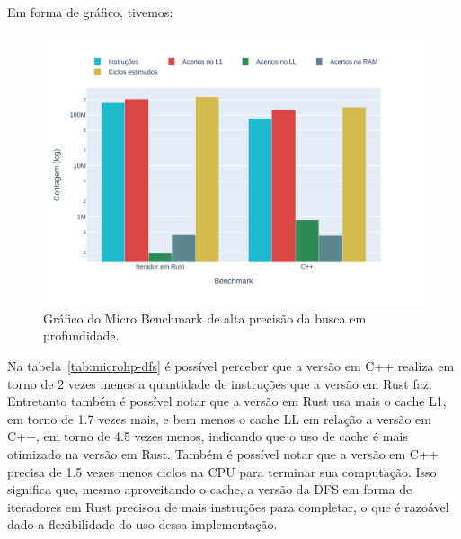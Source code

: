 Em forma de gráfico, tivemos:

\begin{figure}[!ht]
  \centering
  \caption{Gráfico do Micro Benchmark de alta precisão da busca em
  profundidade.}
  \includegraphics[width=\textwidth]{figures/benchmark-chart.pdf}
\end{figure}
\FloatBarrier

Na tabela~\ref{tab:microhp-dfs} é possível perceber que a versão em
C++ realiza em torno de 2 vezes menos a quantidade de instruções que
a versão em Rust faz. Entretanto também é possível notar que a versão
em Rust usa mais o cache L1, em torno de 1.7 vezes mais, e bem menos
o cache LL em relação a versão em C++, em torno de 4.5 vezes menos,
indicando que o uso de cache é mais otimizado na versão em Rust.
Também é possível notar que a versão em C++ precisa de 1.5 vezes
menos ciclos na CPU para terminar sua computação. Isso significa que,
mesmo aproveitando o cache, a versão da DFS em forma de iteradores em
Rust precisou de mais instruções para completar, o que é razoável
dado a flexibilidade do uso dessa implementação.
